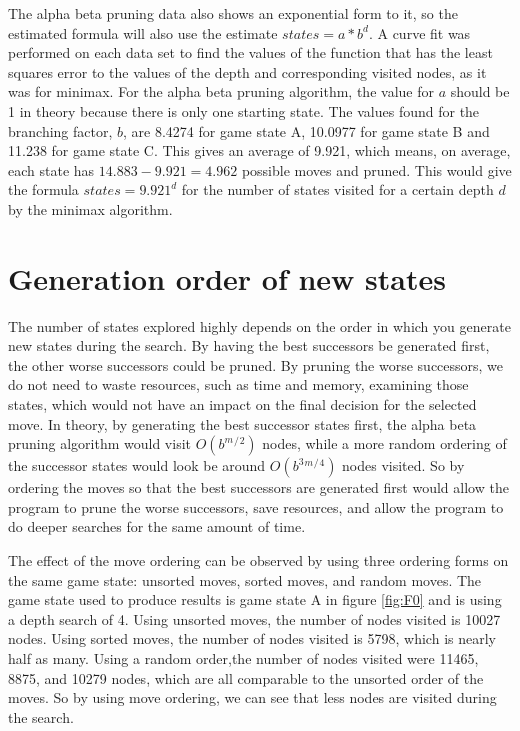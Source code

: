 \documentclass[11pt]{article}
\begin{document}
The alpha beta pruning data also shows an exponential form to it, so the estimated formula will also use the estimate $ states = a*b^d $. A curve fit was performed on each data set to find the values of the function that has the least squares error to the  values of the depth and corresponding visited nodes, as it was for minimax. For the alpha beta pruning algorithm, the value for $a$ should be 1 in theory because there is only one starting state. The values found for the branching factor, $b$, are 8.4274 for game state A, 10.0977 for game state B and 11.238 for game state C. This gives an average of 9.921, which means, on average, each state has $14.883-9.921=4.962$ possible moves and pruned. This would give the formula $ states = 9.921^d $ for the number of states visited for a certain depth $d$ by the minimax algorithm. 

\section{Generation order of new states}
The number of states explored highly depends on the order in which you generate new states during the search. By having the best successors be generated first, the other worse successors could be pruned. By pruning the worse successors, we do not need to waste resources, such as time and memory, examining those states, which would not have an impact on the final decision for the selected move. In theory, by generating the best successor states first, the alpha beta pruning algorithm would visit $O(b^m{}^/{}^2)$ nodes, while a more random ordering of the successor states would look be around $O(b^3{}^m{}^/{}^4)$ nodes visited. So by ordering the moves so that the best successors are generated first would allow the program to prune the worse successors, save resources, and allow the program to do deeper searches for the same amount of time. 

The effect of the move ordering can be observed by using three ordering forms on the same game state: unsorted moves, sorted moves, and random moves. The game state used to produce results is game state A in figure \ref{fig:F0} and is using a depth search of 4. Using unsorted moves, the number of nodes visited is 10027 nodes. Using sorted moves, the number of nodes visited is 5798, which is nearly half as many. Using a random order,the number of nodes visited were 11465, 8875, and 10279 nodes, which are all comparable to the unsorted order of the moves. So by using move ordering, we can see that less nodes are visited during the search.
\end{document}
